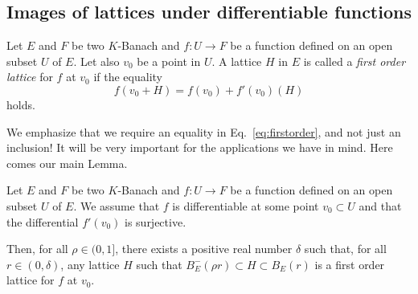 \documentclass{lms}
\begin{document}
\subsection{Images of lattices under differentiable functions}

\begin{deftn}
\label{def:firstorder}
Let $E$ and $F$ be two $K$-Banach and $f : U \rightarrow F$ be a 
function defined on an open subset $U$ of $E$. Let also $v_0$ be a 
point in $U$.
A lattice $H$ in $E$ is called a \emph{first order lattice} for $f$ at 
$v_0$ if the equality
\begin{equation}
\label{eq:firstorder}
f(v_0 + H) = f(v_0) + f'(v_0) (H)
\end{equation}
holds.
\end{deftn}

We emphasize that we require an equality in Eq.~\eqref{eq:firstorder}, 
and not just an inclusion! It will be very important for the 
applications we have in mind.
Here comes our main Lemma.

\begin{lem} \label{lem:main}
Let $E$ and $F$ be two $K$-Banach and $f : U 
\rightarrow F$ be a function defined on an open subset $U$ of $E$.
We assume that $f$ is differentiable at some point $v_0 \subset 
U$ and that the differential $f'(v_0)$ is surjective. 

Then, for all $\rho \in (0, 1]$, there exists a positive real 
number $\delta$ such that, for all $r \in (0, \delta)$, any lattice
$H$ such that $B^-_E(\rho r) \subset H \subset B_E(r)$ is a first
order lattice for $f$ at $v_0$.
\end{lem}
\end{document}
